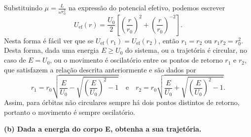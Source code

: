 Substituindo \(\mu = \frac{L}{\omega r_0^2}\) na expressão do potencial efetivo, podemos escrever
\begin{equation}
    U_\mathrm{ef}(r) = \frac{U_0}{2}\left[\left(\frac{r}{r_0}\right)^2 + \left(\frac{r}{r_0}\right)^{-2}\right].
\end{equation}
Nesta forma é fácil ver que se \(U_\mathrm{ef}(r_1) = U_\mathrm{ef}(r_2)\), então \(r_1 = r_2\) ou \(r_1r_2 = r_0^2\). Desta forma, dada uma energia \(E \geq U_0\) do sistema, ou a trajetória é circular, no caso de \(E = U_0\), ou o movimento é oscilatório entre os pontos de retorno \(r_1\) e \(r_2\), que satisfazem a relação descrita anteriormente e são dados por
\begin{equation}
    r_1 = r_0\sqrt{\frac{E}{U_0} - \sqrt{\left(\frac{E}{U_0}\right)^2 - 1}}\quad\text{e}\quad r_2 = r_0\sqrt{\frac{E}{U_0} + \sqrt{\left(\frac{E}{U_0}\right)^2 - 1}}.
\end{equation}
Assim, para órbitas não circulares sempre há dois pontos distintos de retorno, portanto o movimento é sempre oscilatório.

\textbf{(b) Dada a energia do corpo E, obtenha a sua trajetória.}

